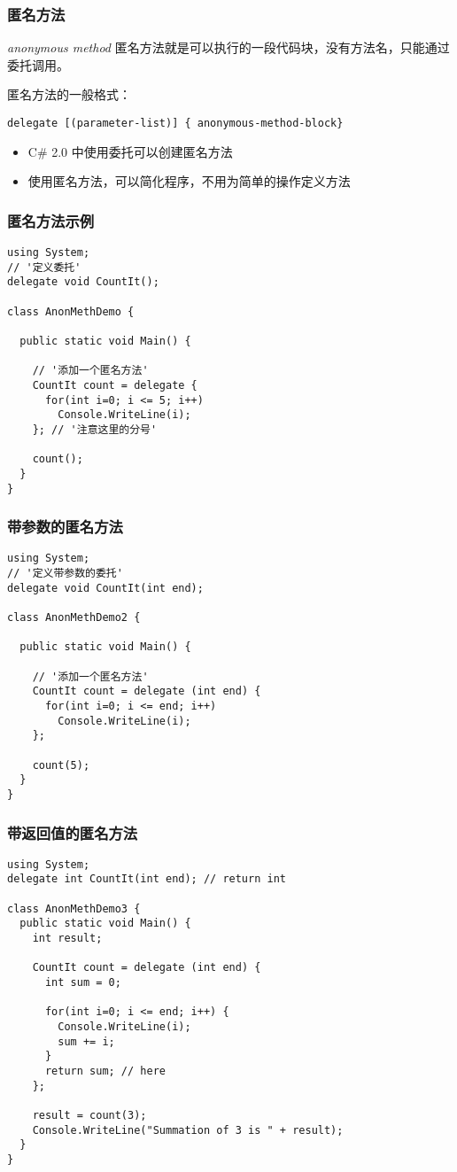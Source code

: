 \begin{frame}[fragile]
\frametitle{匿名方法}
\begin{block}{\textit{anonymous method}}
  \CJKindent 匿名方法就是可以执行的一段代码块，没有方法名，只能通过委托调用。
\end{block}
匿名方法的一般格式：
\begin{lstlisting}
delegate [(parameter-list)] { anonymous-method-block}
\end{lstlisting}
\begin{itemize}
\item C\# 2.0 中使用委托可以创建匿名方法
\item 使用匿名方法，可以简化程序，不用为简单的操作定义方法
\end{itemize}
\end{frame}
\begin{frame}[fragile]
\frametitle{匿名方法示例}
\begin{lstlisting}[escapeinside='']
using System;
// '定义委托'
delegate void CountIt();

class AnonMethDemo {

  public static void Main() {

    // '添加一个匿名方法'
    CountIt count = delegate {
      for(int i=0; i <= 5; i++)
        Console.WriteLine(i);
    }; // '注意这里的分号'

    count();
  }
}
\end{lstlisting}

\end{frame}

\begin{frame}[fragile]
\frametitle{带参数的匿名方法}
\begin{lstlisting}[escapeinside='']
using System;
// '定义带参数的委托'
delegate void CountIt(int end);

class AnonMethDemo2 {

  public static void Main() {

    // '添加一个匿名方法'
    CountIt count = delegate (int end) {
      for(int i=0; i <= end; i++)
        Console.WriteLine(i);
    };

    count(5);
  }
}
\end{lstlisting}

\end{frame}

\begin{frame}
\frametitle{带返回值的匿名方法}
\begin{lstlisting}
using System;
delegate int CountIt(int end); // return int

class AnonMethDemo3 {
  public static void Main() {
    int result;

    CountIt count = delegate (int end) {
      int sum = 0;

      for(int i=0; i <= end; i++) {
        Console.WriteLine(i);
        sum += i;
      }
      return sum; // here
    };

    result = count(3);
    Console.WriteLine("Summation of 3 is " + result);
  }
}
\end{lstlisting}
\end{frame}

